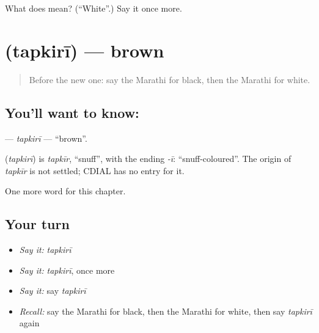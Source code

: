 \begin{tcolorbox}[breakable,colback=teal!4,colframe=teal!35!black,title={Before you move on}]
What does  mean? (\textquotedblleft{}White\textquotedblright{}.) Say it once more.
\end{tcolorbox}
\section[\texorpdfstring{\mr{तपकिरी} (tapkirī)}{तपकिरी (tapkirī)}]{ (tapkirī) — brown}

\label{lesson:MR-C108-tapkiri}



\begin{quote}
Before the new one: say the Marathi for black, then the Marathi for white.
\end{quote}

\subsection*{You'll want to know: }
\textbf{} — \emph{tapkirī} — \textquotedblleft{}brown\textquotedblright{}.

\begin{cousinweb}
\textbf{} (\emph{tapkirī}) is \emph{tapkīr}, \textquotedblleft{}snuff\textquotedblright{}, with the ending \emph{-ī}: \textquotedblleft{}snuff-coloured\textquotedblright{}. The origin of \emph{tapkīr} is not settled; CDIAL has no entry for it.
\end{cousinweb}

\begin{grammarlens}[title={What you've built}]
One more word for this chapter.
\end{grammarlens}

\subsection*{Your turn}
\begin{itemize}
\raggedright
  \item \emph{Say it:} \emph{tapkirī}
  \item \emph{Say it:} \emph{tapkirī}, once more
  \item \emph{Say it:} say \emph{tapkirī}
  \item \emph{Recall:} say the Marathi for black, then the Marathi for white, then say \emph{tapkirī} again
\end{itemize}

